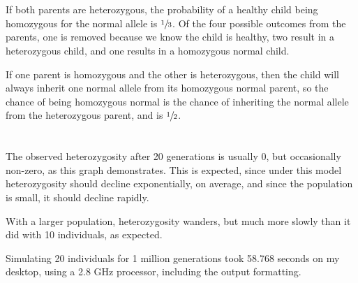 \documentclass{article}
\begin{document}
\section{}

    If both parents are heterozygous, the probability of a healthy child being
    homozygous for the normal allele is $\sfrac{1}{3}$.  Of the four possible
    outcomes from the parents, one is removed because we know the child is
    healthy, two result in a heterozygous child, and one results in a homozygous
    normal child.

    If one parent is homozygous and the other is heterozygous, then the child
    will always inherit one normal allele from its homozygous normal parent, so
    the chance of being homozygous normal is the chance of inheriting the normal
    allele from the heterozygous parent, and is $\sfrac{1}{2}$.

\section{}

\begin{figure}[h]
\begin{center}
    
\end{center}
\end{figure}

The observed heterozygosity after 20 generations is usually 0, but occasionally
non-zero, as this graph demonstrates.  This is expected, since under this model
heterozygosity should decline exponentially, on average, and since the
population is small, it should decline rapidly.

\begin{figure}[h]
\begin{center}
    
\end{center}
\end{figure}

With a larger population, heterozygosity wanders, but much more slowly than it
did with 10 individuals, as expected.

Simulating 20 individuals for 1 million generations took 58.768 seconds on my
desktop, using a 2.8 GHz processor, including the output formatting.


\end{document}
